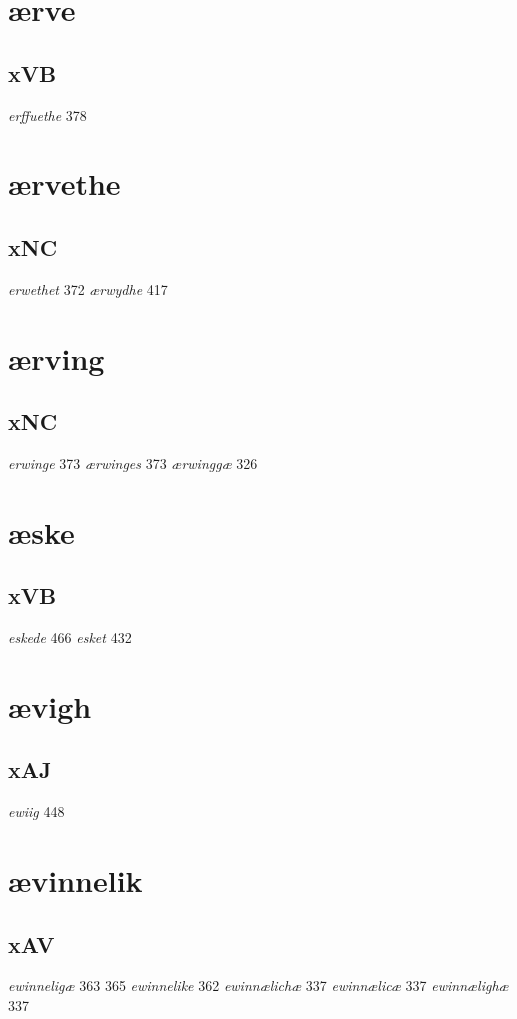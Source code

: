 \documentclass[a4paper,twocolumn]{article}
\begin{document}
\section{ærve}
\label{sec:org3c89723}
\subsection{xVB}
\label{sec:org2942196}
\emph{erffuethe} 378 
\section{ærvethe}
\label{sec:orga73e64c}
\subsection{xNC}
\label{sec:orgb76a7ce}
\emph{erwethet} 372 \emph{ærwydhe} 417 
\section{ærving}
\label{sec:orgf12064e}
\subsection{xNC}
\label{sec:org197ac90}
\emph{erwinge} 373 \emph{ærwinges} 373 \emph{ærwinggæ} 326 
\section{æske}
\label{sec:org6ca963e}
\subsection{xVB}
\label{sec:orgdecb6b9}
\emph{eskede} 466 \emph{esket} 432 
\section{ævigh}
\label{sec:org2f795f3}
\subsection{xAJ}
\label{sec:org6d9e97a}
\emph{ewiig} 448 
\section{ævinnelik}
\label{sec:orga9a3f0c}
\subsection{xAV}
\label{sec:org75296ba}
\emph{ewinneligæ} 363 365 \emph{ewinnelike} 362 \emph{ewinnælichæ} 337 \emph{ewinnælicæ} 337 \emph{ewinnælighæ} 337 
\end{document}
